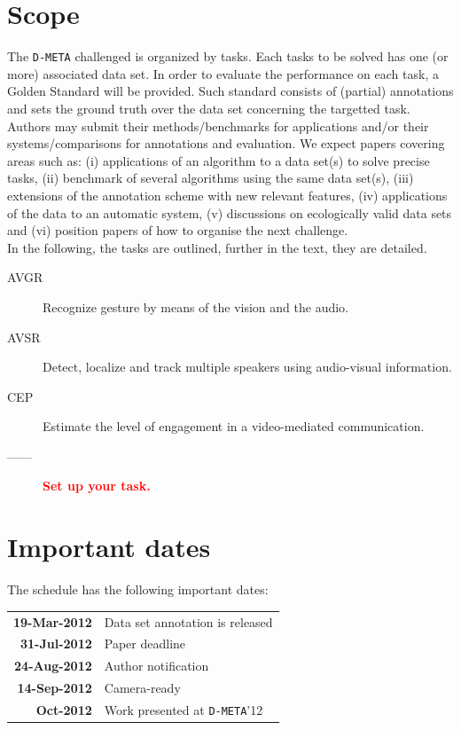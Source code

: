 \documentclass[a4paper]{article}
\newcommand{\todo}[1]{ \textcolor{red}{\bf #1}}
\begin{document}
\section*{Scope}
The \texttt{D-META} challenged is organized by tasks. Each tasks to be solved has one (or more) associated data set. In
order to evaluate the performance on each task, a Golden Standard will be provided. Such standard consists of (partial)
annotations and sets the ground truth over the data set concerning the targetted task.\vspace{0.2cm}\\
Authors may submit their methods/benchmarks for applications and/or their systems/comparisons for
annotations and evaluation. We expect papers covering areas such as: (i) applications of an algorithm to a data
set(s) to solve precise tasks, (ii) benchmark of several algorithms using the same data set(s), (iii) extensions of the
annotation scheme with new relevant features, (iv) applications of the data to an automatic system, (v) discussions on
ecologically valid data sets and (vi) position papers of how to organise the next challenge.\vspace{0.2cm}\\
In the following, the tasks are outlined, further in the text, they are detailed.
\begin{description}
 \item [AVGR] Recognize gesture by means of the vision and the audio.
 \item [AVSR] Detect, localize and track multiple speakers using audio-visual information.
 \item [CEP] Estimate the level of engagement in a video-mediated communication.
 \item [------] \todo{Set up your task.}
\end{description}

\section*{Important dates}
The schedule has the following important dates:
\begin{center}
\begin{tabular}{rl}
 \textbf{19-Mar-2012} & Data set annotation is released \vspace{0.1cm}\\
 \textbf{31-Jul-2012} & Paper deadline \vspace{0.1cm}\\
 \textbf{24-Aug-2012} & Author notification \vspace{0.1cm}\\
 \textbf{14-Sep-2012} & Camera-ready \vspace{0.1cm}\\
    \textbf{Oct-2012} & Work presented at \texttt{D-META}'12 \vspace{0.1cm}\\
\end{tabular}
\end{center}
\end{document}
